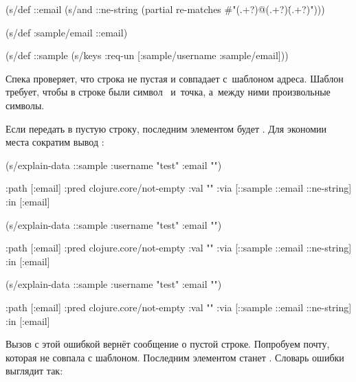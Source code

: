 \else


\begin{clojure}
(s/def ::email
  (s/and
   ::ne-string
   (partial re-matches #"(.+?)@(.+?)\.(.+?)")))

(s/def :sample/email ::email)

(s/def ::sample
  (s/keys :req-un [:sample/username
                   :sample/email]))
\end{clojure}


\fi

Спека  проверяет, что строка не пустая и совпадает с~шаблоном
адреса. Шаблон требует, чтобы в строке были символ~ и~точка, а~между
ними произвольные символы.

Если передать в  пустую строку, последним элементом 
будет . Для экономии места сократим вывод
:

\ifnarrow


\begin{clojure}
(s/explain-data ::sample
  {:username "test" :email ""})

{:path [:email]
 :pred clojure.core/not-empty
 :val ""
 :via [::sample ::email ::ne-string]
 :in [:email]}
\end{clojure}


\else

\ifafive


\begin{clojure}
(s/explain-data ::sample
   {:username "test" :email ""})
\end{clojure}


\pagebreakafive


\begin{clojure}
{:path [:email]
 :pred clojure.core/not-empty
 :val ""
 :via [::sample ::email ::ne-string]
 :in [:email]}
\end{clojure}


\else


\begin{clojure}
(s/explain-data ::sample
   {:username "test" :email ""})

{:path [:email]
 :pred clojure.core/not-empty
 :val ""
 :via [::sample ::email ::ne-string]
 :in [:email]}
\end{clojure}


\fi

\fi

Вызов  с этой ошибкой вернёт сообщение о пустой
строке. Попробуем почту, которая не совпала с шаблоном. Последним элементом
 станет . Словарь ошибки выглядит так:

